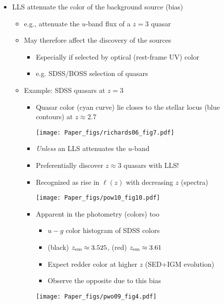 \documentclass[12pt,letterpaper]{article}
\begin{document}
\begin{Aenumerate}
\begin{itemize}
\item LLS attenuate the color of the background source (bias)
  	\begin{itemize}
  	\item e.g., attenuate the $u$-band flux of a $z=3$ quasar
  	\item May therefore affect the discovery of the sources
  		\begin{itemize}
  		\item Especially if selected by optical (rest-frame UV) color
  		\item e.g. SDSS/BOSS selection of quasars
  		\end{itemize}
  	\item Example: SDSS quasars at $z=3$
  		\begin{itemize}
  		\item Quasar color (cyan curve) lie closes to the stellar locus
  		(blue contours) at $z \approx 2.7$

\texttt{[image: Paper\_figs/richards06\_fig7.pdf]}

  		\item {\it Unless} an LLS attenuates the $u$-band
  		\item Preferentially discover $z \approx 3$ quasars with LLS!

  		\item Recognized as rise in $\ell(z)$ with decreasing $z$ (spectra)

\texttt{[image: Paper\_figs/pow10\_fig10.pdf]}

  		\item Apparent in the photometry (colors) too
  		  	\begin{itemize}
  		  	\item $u-g$ color histogram of SDSS colors
  		  	\item (black) $z_{\rm em} \approx 3.525$, (red) $z_{\rm em} \approx 3.61$
  		  	\item Expect redder color at higher $z$ (SED+IGM evolution)
  		  	\item Observe the opposite due to this bias
  		  	\end{itemize}

\texttt{[image: Paper\_figs/pwo09\_fig4.pdf]}

  		\end{itemize}
  	\end{itemize}


\end{itemize}
\end{Aenumerate}
\end{document}
